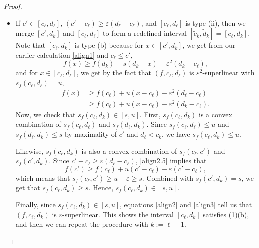 \documentclass{amsart}
\newcommand{\eps}{\varepsilon}
\newcommand{\tc}{\tilde{c}}
\newcommand{\td}{\tilde{d}}
\begin{document}
\begin{proof}
\begin{itemize}
        \item If $c' \in [c_\ell, d_\ell]$, $(c' - c_\ell) \ge \eps(d_\ell - c_\ell)$, and $[c_\ell, d_\ell]$ is type (ii), then we merge $[c', d_k]$ and $[c_\ell, d_\ell]$ to form a redefined interval $[\tc_k, \td_k] = [c_\ell, d_k]$. Note that $[c_\ell, d_k]$ is type (b) because for $x \in [c', d_k]$, we get from our earlier calculation \eqref{align1} and $c_\ell \le c'$,
        \begin{equation}\label{align2}
            f(x) \ge f(d_k) - s (d_k - x) - \eps^2 (d_k - c_\ell),
        \end{equation}
        and for $x \in [c_\ell, d_\ell]$, we get by the fact that $(f, c_\ell, d_\ell)$ is $\eps^2$-superlinear with $s_f (c_\ell, d_\ell) = u$,
        \begin{align}
            f(x) &\ge f(c_\ell) + u(x - c_\ell) - \eps^2 (d_\ell - c_\ell) \label{align2.5}\\
            &\ge f(c_\ell) + u(x - c_\ell) - \eps^2 (d_k - c_\ell). \label{align3}
        \end{align}
        Now, we check that $s_f (c_\ell, d_k) \in [s, u]$. First, $s_f (c_\ell, d_k)$ is a convex combination of $s_f (c_\ell, d_\ell)$ and $s_f (d_\ell, d_k)$. Since $s_f (c_\ell, d_\ell) \le u$ and $s_f (d_\ell, d_k) \le s$ by maximality of $c'$ and $d_\ell < c_k$, we have $s_f (c_\ell, d_k) \le u$.
        
        Likewise, $s_f (c_\ell, d_k)$ is also a convex combination of $s_f (c_\ell, c')$ and $s_f (c', d_k)$. Since $c' - c_\ell \ge \eps (d_\ell - c_\ell)$, \eqref{align2.5} implies that
        \begin{equation*}
            f(c') \ge f(c_\ell) + u(c' - c_\ell) - \eps(c' - c_\ell),
        \end{equation*}
        which means that $s_f (c_\ell, c') \ge u - \eps \ge s$. Combined with $s_f (c', d_k) = s$, we get that $s_f (c_\ell, d_k) \ge s$. Hence, $s_f (c_\ell, d_k) \in [s, u]$.

        Finally, since $s_f (c_\ell, d_k) \in [s, u]$, equations \eqref{align2} and \eqref{align3} tell us that $(f, c_\ell, d_k)$ is $\eps$-superlinear. This shows the interval $[c_\ell, d_k]$ satisfies (1)(b), and then we can repeat the procedure with $k := \ell-1$.


\end{itemize}
\end{proof}
\end{document}
